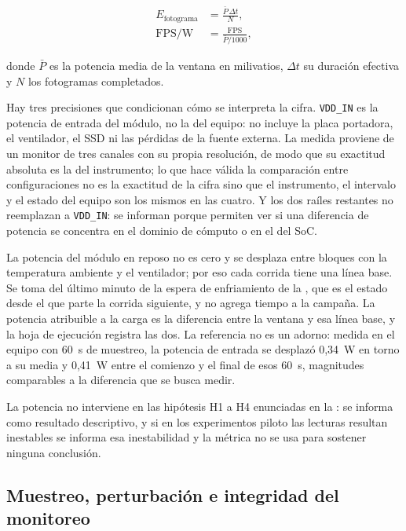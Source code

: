 \begin{align}
  E_{\text{fotograma}} &= \frac{\bar{P}\,\Delta t}{N}
    \label{eq:energia-fotograma},\\
  \text{FPS/W} &= \frac{\text{FPS}}{\bar{P}/1000}
    \label{eq:fps-watio},
\end{align}

\noindent donde $\bar{P}$ es la potencia media de la ventana en milivatios,
$\Delta t$ su duración efectiva y $N$ los fotogramas completados.

Hay tres precisiones que condicionan cómo se interpreta la cifra.
\texttt{VDD\_IN} es la potencia de entrada del módulo, no la del equipo: no
incluye la placa portadora, el ventilador, el SSD ni las pérdidas de la fuente
externa. La medida proviene de un monitor de tres canales con su propia
resolución, de modo que su exactitud absoluta es la del instrumento; lo que
hace válida la comparación entre configuraciones no es la exactitud de la
cifra sino que el instrumento, el intervalo y el estado del equipo son los
mismos en las cuatro. Y los dos raíles restantes no reemplazan a
\texttt{VDD\_IN}: se informan porque permiten ver si una diferencia de
potencia se concentra en el dominio de cómputo o en el del SoC.

La potencia del módulo en reposo no es cero y se desplaza entre bloques con la
temperatura ambiente y el ventilador; por eso cada corrida tiene una línea
base. Se toma del último minuto de la espera de enfriamiento de la
, que es el estado desde el que parte la corrida
siguiente, y no agrega tiempo a la campaña. La potencia atribuible a la carga
es la diferencia entre la ventana y esa línea base, y la hoja de ejecución
registra las dos. La referencia no es un adorno: medida en el equipo con 60~s
de muestreo, la potencia de entrada se desplazó 0,34~W en torno a su media y
0,41~W entre el comienzo y el final de esos 60~s, magnitudes comparables a la
diferencia que se busca medir.

La potencia no interviene en las hipótesis H1 a H4 enunciadas en la
: se informa como resultado descriptivo, y si en los
experimentos piloto las lecturas resultan inestables se informa esa
inestabilidad y la métrica no se usa para sostener ninguna conclusión.

\subsection{Muestreo, perturbación e integridad del monitoreo}
\label{sec:monitoring}

